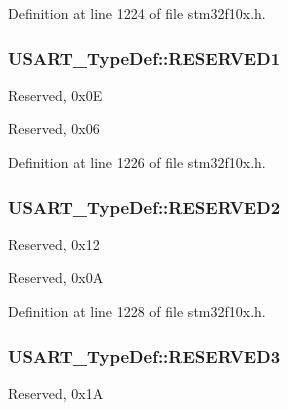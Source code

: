 Definition at line 1224 of file stm32f10x.\-h.

\hypertarget{struct_u_s_a_r_t___type_def_a6d78680272a465db0ee43eba4e9c54f3}{
\subsubsection[{R\-E\-S\-E\-R\-V\-E\-D1}]{ U\-S\-A\-R\-T\-\_\-\-Type\-Def\-::\-R\-E\-S\-E\-R\-V\-E\-D1}}\label{struct_u_s_a_r_t___type_def_a6d78680272a465db0ee43eba4e9c54f3}
Reserved, 0x0\-E

Reserved, 0x06 

Definition at line 1226 of file stm32f10x.\-h.

\hypertarget{struct_u_s_a_r_t___type_def_af2b7924854e56d0ebd3e8699dfd0e369}{
\subsubsection[{R\-E\-S\-E\-R\-V\-E\-D2}]{ U\-S\-A\-R\-T\-\_\-\-Type\-Def\-::\-R\-E\-S\-E\-R\-V\-E\-D2}}\label{struct_u_s_a_r_t___type_def_af2b7924854e56d0ebd3e8699dfd0e369}
Reserved, 0x12

Reserved, 0x0\-A 

Definition at line 1228 of file stm32f10x.\-h.

\hypertarget{struct_u_s_a_r_t___type_def_a158066c974911c14efd7ea492ea31137}{
\subsubsection[{R\-E\-S\-E\-R\-V\-E\-D3}]{ U\-S\-A\-R\-T\-\_\-\-Type\-Def\-::\-R\-E\-S\-E\-R\-V\-E\-D3}}\label{struct_u_s_a_r_t___type_def_a158066c974911c14efd7ea492ea31137}
Reserved, 0x1\-A

